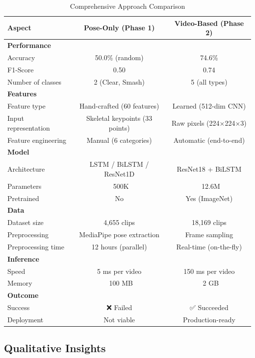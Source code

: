 \documentclass[11pt,a4paper]{article}
\begin{document}
\begin{table}[H]
\centering
\caption{Comprehensive Approach Comparison}
\begin{tabular}{lcc}
\toprule
Aspect & Pose-Only (Phase 1) & Video-Based (Phase 2) \\
\midrule
\textbf{Performance} & & \\
\quad Accuracy & 50.0\% (random) & 74.6\% \\
\quad F1-Score & 0.50 & 0.74 \\
\quad Number of classes & 2 (Clear, Smash) & 5 (all types) \\
\midrule
\textbf{Features} & & \\
\quad Feature type & Hand-crafted (60 features) & Learned (512-dim CNN) \\
\quad Input representation & Skeletal keypoints (33 points) & Raw pixels (224×224×3) \\
\quad Feature engineering & Manual (6 categories) & Automatic (end-to-end) \\
\midrule
\textbf{Model} & & \\
\quad Architecture & LSTM / BiLSTM / ResNet1D & ResNet18 + BiLSTM \\
\quad Parameters & ~500K & ~12.6M \\
\quad Pretrained & No & Yes (ImageNet) \\
\midrule
\textbf{Data} & & \\
\quad Dataset size & 4,655 clips & 18,169 clips \\
\quad Preprocessing & MediaPipe pose extraction & Frame sampling \\
\quad Preprocessing time & 12 hours (parallel) & Real-time (on-the-fly) \\
\midrule
\textbf{Inference} & & \\
\quad Speed & 5 ms per video & 150 ms per video \\
\quad Memory & ~100 MB & ~2 GB \\
\midrule
\textbf{Outcome} & & \\
\quad Success & ❌ Failed & ✅ Succeeded \\
\quad Deployment & Not viable & Production-ready \\
\bottomrule
\end{tabular}
\end{table}

\subsection{Qualitative Insights}
\end{document}
